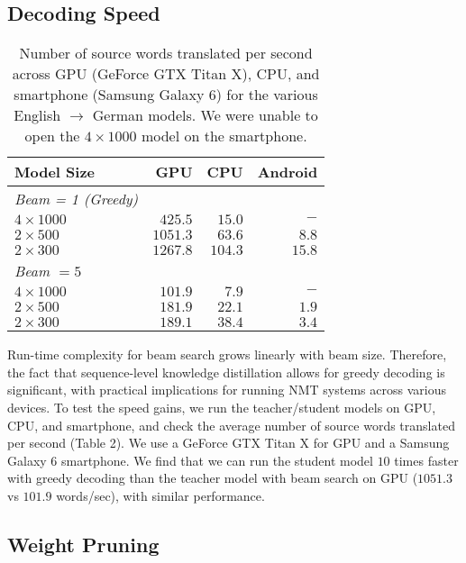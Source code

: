 \documentclass[11pt,letterpaper]{article}
\begin{document}
\subsection{Decoding Speed}
\begin{table}[t] \label{speed}
\centering
\small
\begin{tabular}{l  r  r  r  }
\toprule
Model Size  & GPU & CPU & Android \\
\midrule
\textit{Beam = 1 (Greedy)}\\
\midrule 
$4 \times 1000$ &$425.5$& $15.0$& $-$   \\
$2 \times 500$ &$1051.3$& $63.6$&$8.8$   \\
$2 \times 300$& $1267.8$& $104.3$&$15.8$   \\
\midrule
\textit{Beam $=5$} \\
\midrule
$4 \times 1000$ &$101.9$ & $7.9$ & $-$  \\
$2 \times 500$ & $181.9$&  $22.1$ & $1.9$ \\
$2 \times 300$ & $189.1$&  $38.4$ &$3.4$ \\
\bottomrule
\end{tabular}
\caption{Number of source words translated per second across GPU (GeForce GTX Titan X), 
CPU, and smartphone (Samsung Galaxy 6) for the various English $\rightarrow$ German models. 
We were unable to open the $4 \times 1000$ model on the smartphone.}
\end{table}

Run-time complexity for beam search grows linearly with beam size. Therefore,
the fact that sequence-level knowledge distillation allows for greedy decoding  is 
 significant, with practical implications for running NMT systems across various devices. 
 To test the  speed gains,
we run the teacher/student models on GPU, CPU, and smartphone, and check the average
number of source words translated per second (Table 2). We use a GeForce GTX Titan X for 
GPU and a Samsung Galaxy 6 smartphone. We find that we can run the
student model $10$ times faster with greedy decoding than the teacher model with beam search 
on GPU ($1051.3$ vs $101.9$ words/sec), with similar performance.


\subsection{Weight Pruning}
\end{document}
